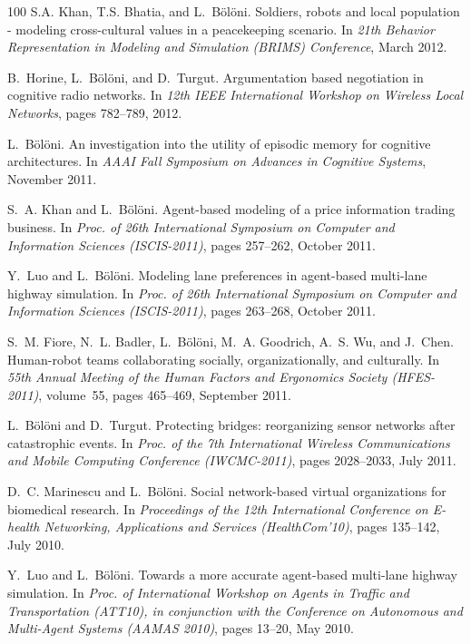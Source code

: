 \begin{thebibliography}{100}
S.A. Khan, T.S. Bhatia, and L.~Bölöni.
\newblock Soldiers, robots and local population - modeling cross-cultural
  values in a peacekeeping scenario.
\newblock In {\em 21th Behavior Representation in Modeling and Simulation
  (BRIMS) Conference}, March 2012.

B.~Horine, L.~Bölöni, and D.~Turgut.
\newblock Argumentation based negotiation in cognitive radio networks.
\newblock In {\em 12th IEEE International Workshop on Wireless Local Networks},
  pages 782--789, 2012.

L.~Bölöni.
\newblock An investigation into the utility of episodic memory for cognitive
  architectures.
\newblock In {\em AAAI Fall Symposium on Advances in Cognitive Systems},
  November 2011.

S.~A. Khan and L.~Bölöni.
\newblock Agent-based modeling of a price information trading business.
\newblock In {\em Proc. of 26th International Symposium on Computer and
  Information Sciences (ISCIS-2011)}, pages 257--262, October 2011.

Y.~Luo and L.~Bölöni.
\newblock Modeling lane preferences in agent-based multi-lane highway
  simulation.
\newblock In {\em Proc. of 26th International Symposium on Computer and
  Information Sciences (ISCIS-2011)}, pages 263--268, October 2011.

S.~M. Fiore, N.~L. Badler, L.~Bölöni, M.~A. Goodrich, A.~S. Wu, and J.~Chen.
\newblock Human-robot teams collaborating socially, organizationally, and
  culturally.
\newblock In {\em 55th Annual Meeting of the Human Factors and Ergonomics
  Society (HFES-2011)}, volume~55, pages 465--469, September 2011.

L.~Bölöni and D.~Turgut.
\newblock Protecting bridges: reorganizing sensor networks after catastrophic
  events.
\newblock In {\em Proc. of the 7th International Wireless Communications and
  Mobile Computing Conference (IWCMC-2011)}, pages 2028--2033, July 2011.

D.~C. Marinescu and L.~Bölöni.
\newblock Social network-based virtual organizations for biomedical research.
\newblock In {\em Proceedings of the 12th International Conference on E-health
  Networking, Applications and Services (HealthCom'10)}, pages 135--142, July
  2010.

Y.~Luo and L.~Bölöni.
\newblock Towards a more accurate agent-based multi-lane highway simulation.
\newblock In {\em Proc. of International Workshop on Agents in Traffic and
  Transportation (ATT10), in conjunction with the Conference on Autonomous and
  Multi-Agent Systems (AAMAS 2010)}, pages 13--20, May 2010.


\end{thebibliography}
